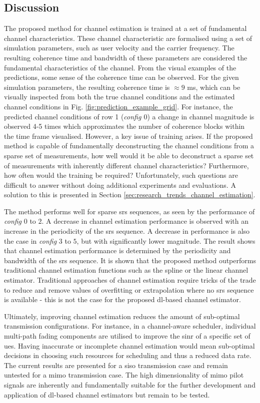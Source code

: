 \subsection{Discussion}
The proposed method for channel estimation is trained at a set of fundamental channel characteristics. These channel characteristic are formalised using a set of simulation parameters, such as user velocity and the carrier frequency. The resulting coherence time and bandwidth of these parameters are considered the fundamental characteristics of the channel. From the visual examples of the predictions, some sense of the coherence time can be observed. For the given simulation parameters, the resulting coherence time is $\approx 9$ ms, which can be visually inspected from both the true channel conditions and the estimated channel conditions in Fig. \ref{fig:prediction_example_grid}. For instance, the predicted channel conditions of row 1 (\emph{config $0$}) a change in channel magnitude is observed 4-5 times which approximates the number of coherence blocks within the time frame visualised. However, a key issue of training arises. If the proposed method is capable of fundamentally deconstructing the channel conditions from a sparse set of measurements, how well would it be able to deconstruct a sparse set of measurements with inherently different channel characteristics? Furthermore, how often would the training be required? Unfortunately, such questions are difficult to answer without doing additional experiments and evaluations. A solution to this is presented in Section \ref{sec:research_trends_channel_estimation}.

The method performs well for sparse \gls{srs} sequences, as seen by the performance of \emph{config} $0$ to $2$. A decrease in channel estimation performance is observed with an increase in the periodicity of the \gls{srs} sequence.  A decrease in performance is also the case in \emph{config} $3$ to $5$, but with significantly lower magnitude. The result shows that channel estimation performance is determined by the periodicity and bandwidth of the \gls{srs} sequence. It is shown that the proposed method outperforms traditional channel estimation functions such as the spline or the linear channel estimator. Traditional approaches of channel estimation require tricks of the trade to reduce and remove values of overfitting or extrapolation where no \gls{srs} sequence is available - this is not the case for the proposed \gls{dl}-based channel estimator.

Ultimately, improving channel estimation reduces the amount of sub-optimal transmission configurations. For instance, in a channel-aware scheduler, individual multi-path fading components are utilised to improve the \gls{sinr} of a specific set of \glspl{ue}. Having inaccurate or incomplete channel estimation would mean sub-optimal decisions in choosing such resources for scheduling and thus a reduced data rate. The current results are presented for a \gls{siso} transmission case and remain untested for a \gls{mimo} transmission case. The high dimensionality of \gls{mimo} pilot signals are inherently and fundamentally suitable for the further development and application of \gls{dl}-based channel estimators but remain to be tested. 

